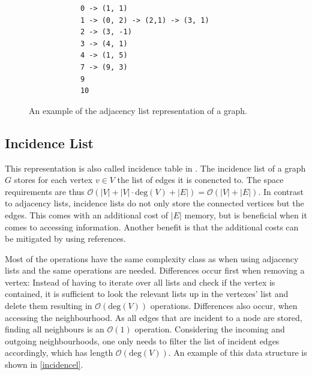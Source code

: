         \begin{figure}[htp]
         \begin{center}
          \begin{verbatim}
            0 -> (1, 1)
            1 -> (0, 2) -> (2,1) -> (3, 1)
            2 -> (3, -1)
            3 -> (4, 1)
            4 -> (1, 5)
            7 -> (9, 3)
            9
            10
          \end{verbatim}
         \end{center}
         \caption{An example of the adjacency list representation of a graph.}
         \label{adjl}
        \end{figure}
        
        \subsection*{Incidence List}\label{inci}
            This representation is also called incidence table in \autocite{Gross1998GraphTA}.
            The incidence list of a graph $G$ stores for each vertex $v \in V$ the list of edges it is conencted to. 
            The space requirements are thus $\mathcal{O}(|V| + |V| \cdot \text{deg}(V) + |E|) = \mathcal{O}(|V| + |E|)$. 
            In contrast to adjacency lists, incidence lists do not only store the connected vertices but the edges. 
            This comes with an additional cost of $|E|$ memory, but is beneficial when it comes to accessing information. 
            Another benefit is that the additional costs can be mitigated by using references.
            
            Most of the operations have the same complexity class as when using adjacency lists and the same operations are needed. 
            Differences occur first when removing a vertex:
            Instead of having to iterate over all lists and check if the vertex is contained, it is sufficient to look the relevant lists up in the vertexes' list and delete them resulting in $\mathcal{O}(\text{deg}(V))$ operations.        
            Differences also occur, when accessing the neighbourhood. 
            As all edges that are incident to a node are stored, finding all neighbours is an $\mathcal{O}(1)$ operation. 
            Considering the incoming and outgoing neighbourhoods, one only needs to filter the list of incident edges accordingly, which has length $\mathcal{O}(\text{deg}(V))$.
            An example of this data structure is shown in \ref{incidencel}.
        
